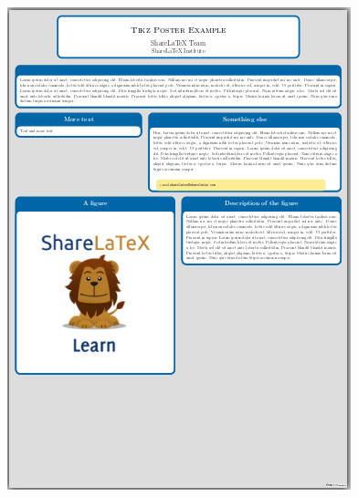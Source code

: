 \documentclass[25pt, a0paper, portrait]{tikzposter}
\begin{document}
\begin{columns}
    {
	\begin{tikzfigure}
	    \includegraphics[width=\linewidth]{Tikzposter_theme/Envelope}
	\end{tikzfigure}
    }
    {
	\begin{tikzfigure}

\end{tikzfigure}}
\end{columns}
\end{document}
